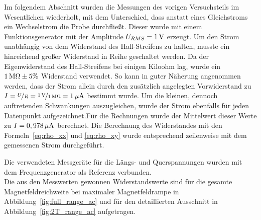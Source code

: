 
Im folgendem Abschnitt wurden die Messungen des vorigen Versuchsteils im Wesentlichen wiederholt, mit dem Unterschied, dass anstatt eines Gleichstroms ein Wechselstrom die Probe durchfließt. 
Dieser wurde mit einem Funktionsgenerator mit der Amplitude $U_{RMS}=\unit[1]{V}$ erzeugt. Um den Strom unabhängig von dem Widerstand des Hall-Streifens zu halten, musste ein hinreichend großer Widerstand in Reihe geschaltet werden. Da der Eigenwiderstand des Hall-Streifens bei einigen Kiloohm lag, wurde ein $\unit[1]{M\Omega}\pm 5\%$ Widerstand verwendet. So kann in guter Näherung angenommen werden, dass der Strom allein durch den zusätzlich angelegten Vorwiderstand zu $I=\nicefrac{U}{R}=\nicefrac{\unit[1]{V}}{\unit[1]{M\Omega}}=\unit[1]{\mu A}$ bestimmt wurde. Um die kleinen, dennoch auftretenden Schwankungen auszugleichen, wurde der Strom ebenfalls für jeden Datenpunkt aufgezeichnet.Für die Rechnungen wurde der Mittelwert dieser Werte zu $I=\unit[0,978]{\mu A}$ berechnet. Die Berechnung des Widerstandes mit den Formeln~\eqref{eq:rho_xx} und \eqref{eq:rho_xy} wurde entsprechend zeilenweise mit dem gemessenen Strom durchgeführt.

Die verwendeten Messgeräte für die Längs- und Querspannungen wurden mit dem Frequenzgenerator als Referenz verbunden. %
\\

Die aus den Messwerten gewonnen Widerstandswerte sind für die gesamte Magnetfeldreichweite bei maximaler Magnetfeldrampe in Abbildung~\ref{fig:full_range_ac} und für den detaillierten Ausschnitt in Abbildung~\ref{fig:2T_range_ac} aufgetragen.

